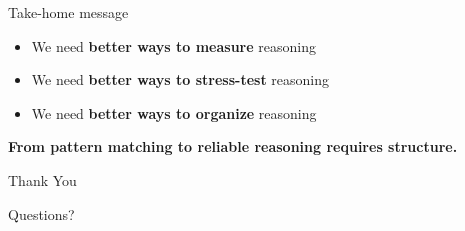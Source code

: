 \begin{frame}{Take-home message}
  \begin{itemize}
    \item We need \textbf{better ways to measure} reasoning
    \item We need \textbf{better ways to stress-test} reasoning
    \item We need \textbf{better ways to organize} reasoning
  \end{itemize}

  \vspace{2em}

  \begin{center}
    \Large
    \textbf{From pattern matching to reliable reasoning requires structure.}
  \end{center}

\end{frame}

\begin{frame}[plain]
  \begin{center}
    \vspace{3em}
    {\Huge Thank You}

    \vspace{2em}

    {\Large Questions?}
  \end{center}
\end{frame}
